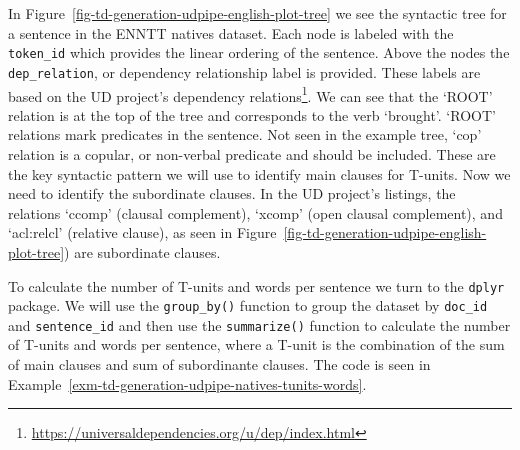 \documentclass[
  letterpaper,
  DIV=11,
  numbers=noendperiod]{scrreport}
\theoremstyle{definition}
\theoremstyle{remark}
\DeclareRobustCommand{\href}[2]{#2\footnote{\url{#1}}}
\begin{document}
In Figure~\ref{fig-td-generation-udpipe-english-plot-tree} we see the
syntactic tree for a sentence in the ENNTT natives dataset. Each node is
labeled with the \texttt{token\_id} which provides the linear ordering
of the sentence. Above the nodes the \texttt{dep\_relation}, or
dependency relationship label is provided. These labels are based on the
UD project's
\href{https://universaldependencies.org/u/dep/index.html}{dependency
relations}. We can see that the `ROOT' relation is at the top of the
tree and corresponds to the verb `brought'. `ROOT' relations mark
predicates in the sentence. Not seen in the example tree, `cop' relation
is a copular, or non-verbal predicate and should be included. These are
the key syntactic pattern we will use to identify main clauses for
T-units. Now we need to identify the subordinate clauses. In the UD
project's listings, the relations `ccomp' (clausal complement), `xcomp'
(open clausal complement), and `acl:relcl' (relative clause), as seen in
Figure~\ref{fig-td-generation-udpipe-english-plot-tree}) are subordinate
clauses.

To calculate the number of T-units and words per sentence we turn to the
\texttt{dplyr} package. We will use the \texttt{group\_by()} function to
group the dataset by \texttt{doc\_id} and \texttt{sentence\_id} and then
use the \texttt{summarize()} function to calculate the number of T-units
and words per sentence, where a T-unit is the combination of the sum of
main clauses and sum of subordinante clauses. The code is seen in
Example~\ref{exm-td-generation-udpipe-natives-tunits-words}.
\end{document}
